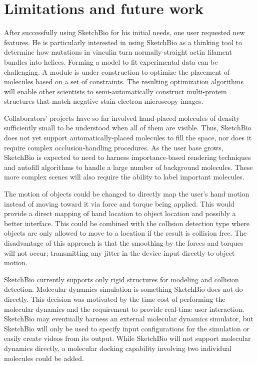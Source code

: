 \documentclass[twocolumn]{bmcart}%
\begin{document}
\section*{Limitations and future work}
After successfully using SketchBio for his initial needs, one user requested new features.
He is particularly interested in using SketchBio as a thinking tool to determine how mutations in vinculin turn normally-straight actin filament bundles into helices.
Forming a model to fit experimental data can be challenging.  A module is under construction to optimize the placement of molecules based on a set of constraints.
The resulting optimization algorithms will enable other scientists to semi-automatically construct multi-protein structures that match negative stain electron microscopy images.

Collaborators' projects have so far involved hand-placed molecules of density sufficiently small to be understood when all of them are visible.
Thus, SketchBio does not yet support automatically-placed molecules to fill the space, nor does it require complex occlusion-handling procedures.
As the user base grows, SketchBio is expected to need to harness importance-based rendering techniques and autofill algorithms to handle a large number of background molecules. These more complex scenes will also require the ability to label important molecules.

The motion of objects could be changed to directly map the user's hand motion instead of moving toward it via force and torque being applied.
This would provide a direct mapping of hand location to object location and possibly a better interface.
This could be combined with the collision detection type where objects are only allowed to move to a location if the result is collision free.
The disadvantage of this approach is that the smoothing by the forces and torques will not occur; transmitting any jitter in the device input directly to object motion.

SketchBio currently supports only rigid structures for modeling and collision detection.
Molecular dynamics simulation is something SketchBio does not do directly.
This decision was motivated by the time cost of performing the molecular dynamics and the requirement to provide real-time user interaction.
SketchBio may eventually harness an external molecular dynamics simulator, but SketchBio will only be used to specify input configurations for the simulation or easily create videos from its output. While SketchBio will not support molecular dynamics directly, a molecular docking capability involving two individual molecules could be added.
\end{document}
